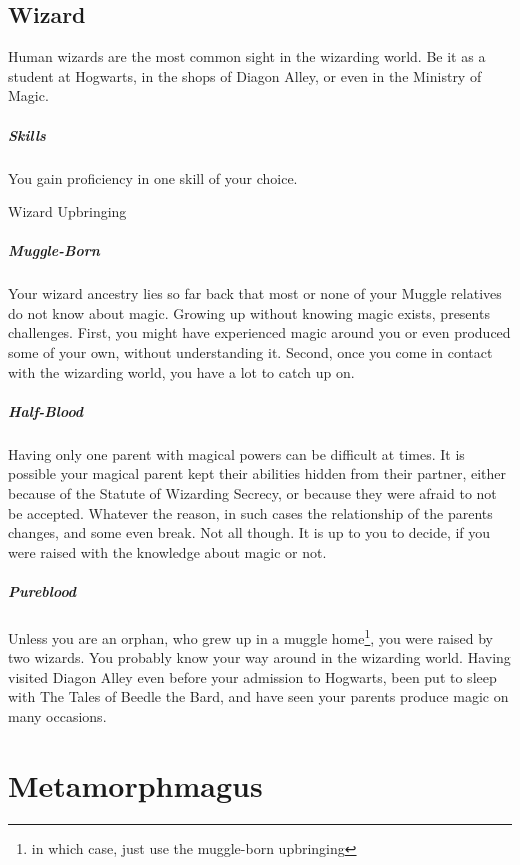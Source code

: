 \documentclass[a4paper,twocolumn,openany,nodeprecatedcode]{dndbook}
\begin{document}
        \subsection{Wizard}

            Human wizards are the most common sight in the wizarding world.
            Be it as a student at Hogwarts, in the shops of Diagon Alley, or even in the Ministry of Magic.

            \subparagraph{Skills} You gain proficiency in one skill of your choice.

            \begin{DndSidebar}{Wizard Upbringing}
                \subparagraph{Muggle-Born}
                Your wizard ancestry lies so far back that most or none of your Muggle relatives do not know about magic.
                Growing up without knowing magic exists, presents challenges.
                First, you might have experienced magic around you or even produced some of your own, without understanding it.
                Second, once you come in contact with the wizarding world, you have a lot to catch up on.

                \subparagraph{Half-Blood}
                Having only one parent with magical powers can be difficult at times.
                It is possible your magical parent kept their abilities hidden from their partner,
                either because of the Statute of Wizarding Secrecy, or because they were afraid to not be accepted.
                Whatever the reason, in such cases the relationship of the parents changes, and some even break.
                Not all though.
                It is up to you to decide, if you were raised with the knowledge about magic or not.

                \subparagraph{Pureblood}
                Unless you are an orphan, who grew up in a muggle home\footnote{in which case, just use the muggle-born upbringing}, you were raised by two wizards.
                You probably know your way around in the wizarding world.
                Having visited Diagon Alley even before your admission to Hogwarts,
                been put to sleep with The Tales of Beedle the Bard,
                and have seen your parents produce magic on many occasions.

            \end{DndSidebar}


    \section{Metamorphmagus}
\end{document}
